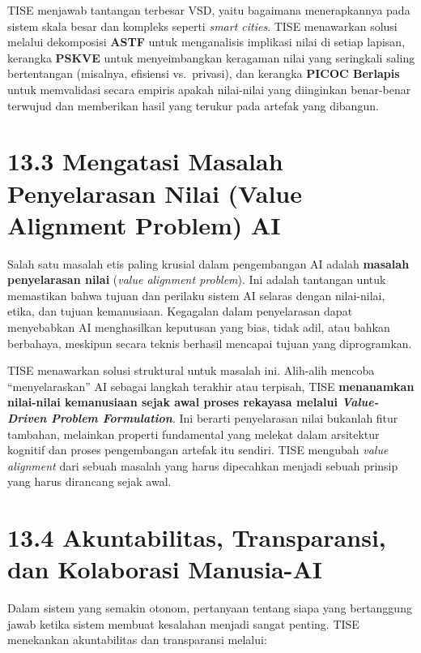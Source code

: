 \documentclass[
  letterpaper,
  DIV=11,
  numbers=noendperiod]{scrreprt}
\begin{document}
TISE menjawab tantangan terbesar VSD, yaitu bagaimana menerapkannya pada
sistem skala besar dan kompleks seperti \emph{smart cities}. TISE
menawarkan solusi melalui dekomposisi \textbf{ASTF} untuk menganalisis
implikasi nilai di setiap lapisan, kerangka \textbf{PSKVE} untuk
menyeimbangkan keragaman nilai yang seringkali saling bertentangan
(misalnya, efisiensi vs.~privasi), dan kerangka \textbf{PICOC Berlapis}
untuk memvalidasi secara empiris apakah nilai-nilai yang diinginkan
benar-benar terwujud dan memberikan hasil yang terukur pada artefak yang
dibangun.

\section{\texorpdfstring{\textbf{13.3 Mengatasi Masalah Penyelarasan
Nilai (Value Alignment Problem)
AI}}{13.3 Mengatasi Masalah Penyelarasan Nilai (Value Alignment Problem) AI}}\label{mengatasi-masalah-penyelarasan-nilai-value-alignment-problem-ai}

Salah satu masalah etis paling krusial dalam pengembangan AI adalah
\textbf{masalah penyelarasan nilai} (\emph{value alignment problem}).
Ini adalah tantangan untuk memastikan bahwa tujuan dan perilaku sistem
AI selaras dengan nilai-nilai, etika, dan tujuan kemanusiaan. Kegagalan
dalam penyelarasan dapat menyebabkan AI menghasilkan keputusan yang
bias, tidak adil, atau bahkan berbahaya, meskipun secara teknis berhasil
mencapai tujuan yang diprogramkan.

TISE menawarkan solusi struktural untuk masalah ini. Alih-alih mencoba
``menyelaraskan'' AI sebagai langkah terakhir atau terpisah, TISE
\textbf{menanamkan nilai-nilai kemanusiaan sejak awal proses rekayasa
melalui \emph{Value-Driven Problem Formulation}}. Ini berarti
penyelarasan nilai bukanlah fitur tambahan, melainkan properti
fundamental yang melekat dalam arsitektur kognitif dan proses
pengembangan artefak itu sendiri. TISE mengubah \emph{value alignment}
dari sebuah masalah yang harus dipecahkan menjadi sebuah prinsip yang
harus dirancang sejak awal.

\section{\texorpdfstring{\textbf{13.4 Akuntabilitas, Transparansi, dan
Kolaborasi
Manusia-AI}}{13.4 Akuntabilitas, Transparansi, dan Kolaborasi Manusia-AI}}\label{akuntabilitas-transparansi-dan-kolaborasi-manusia-ai}

Dalam sistem yang semakin otonom, pertanyaan tentang siapa yang
bertanggung jawab ketika sistem membuat kesalahan menjadi sangat
penting. TISE menekankan akuntabilitas dan transparansi melalui:
\end{document}
